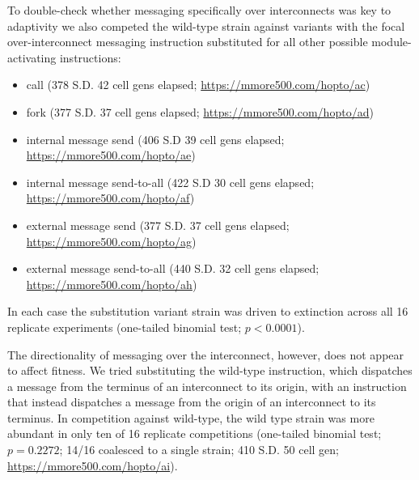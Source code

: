 To double-check whether messaging specifically over interconnects was key to adaptivity we also competed the wild-type strain against variants with the focal over-interconnect messaging instruction substituted for all other possible module-activating instructions:
\begin{itemize}
  \item call (378 S.D. 42 cell gens elapsed; \url{https://mmore500.com/hopto/ac})
  \item fork (377 S.D. 37 cell gens elapsed; \url{https://mmore500.com/hopto/ad})
  \item internal message send (406 S.D 39 cell gens elapsed; \url{https://mmore500.com/hopto/ae})
  \item internal message send-to-all (422 S.D 30 cell gens elapsed; \url{https://mmore500.com/hopto/af})
  \item external message send (377 S.D. 37 cell gens elapsed; \url{https://mmore500.com/hopto/ag})
  \item external message send-to-all (440 S.D. 32 cell gens elapsed; \url{https://mmore500.com/hopto/ah})
\end{itemize}
In each case the substitution variant strain was driven to extinction across all 16 replicate experiments (one-tailed binomial test; $p < 0.0001$).


The directionality of messaging over the interconnect, however, does not appear to affect fitness.
We tried substituting the wild-type instruction, which dispatches a message from the terminus of an interconnect to its origin, with an instruction that instead dispatches a message from the origin of an interconnect to its terminus.
In competition against wild-type, the wild type strain was more abundant in only ten of 16 replicate competitions (one-tailed binomial test; $p = 0.2272$; 14/16 coalesced to a single strain; 410 S.D. 50 cell gen; \url{https://mmore500.com/hopto/ai}).

